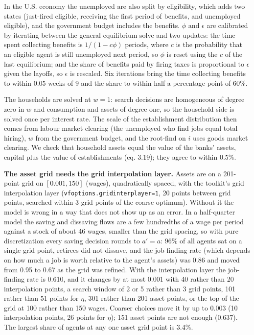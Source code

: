 \documentclass[11pt,fleqn]{article}
\begin{document}
In the U.S. economy the unemployed are also split by eligibility, which adds two states (just-fired eligible, receiving the first period of benefits, and unemployed eligible), and the government budget includes the benefits. $\phi$ and $\epsilon$ are calibrated by iterating between the general equilibrium solve and two updates: the time spent collecting benefits is $1/(1-c\phi)$ periods, where $c$ is the probability that an eligible agent is still unemployed next period, so $\phi$ is reset using the $c$ of the last equilibrium; and the share of benefits paid by firing taxes is proportional to $\epsilon$ given the layoffs, so $\epsilon$ is rescaled. Six iterations bring the time collecting benefits to within 0.05 weeks of 9 and the share to within half a percentage point of 60\%.

The households are solved at $w=1$: search decisions are homogeneous of degree zero in $w$ and consumption and assets of degree one, so the household side is solved once per interest rate. The scale of the establishment distribution then comes from labour market clearing (the unemployed who find jobs equal total hiring), $w$ from the government budget, and the root-find on $i$ uses goods market clearing. We check that household assets equal the value of the banks' assets, capital plus the value of establishments (eq. 3.19); they agree to within 0.5\%.

\textbf{The asset grid needs the grid interpolation layer.} Assets are on a 201-point grid on $[0.001,150]$ (wages), quadratically spaced, with the toolkit's grid interpolation layer (\verb|vfoptions.gridinterplayer=1|, 20 points between grid points, searched within 3 grid points of the coarse optimum). Without it the model is wrong in a way that does not show up as an error. In a half-quarter model the saving and dissaving flows are a few hundredths of a wage per period against a stock of about 46 wages, smaller than the grid spacing, so with pure discretization every saving decision rounds to $a'=a$: 96\% of all agents sat on a single grid point, retirees did not dissave, and the job-finding rate (which depends on how much a job is worth relative to the agent's assets) was 0.86 and moved from 0.95 to 0.67 as the grid was refined. With the interpolation layer the job-finding rate is 0.610, and it changes by at most 0.001 with 40 rather than 20 interpolation points, a search window of 2 or 5 rather than 3 grid points, 101 rather than 51 points for $\eta$, 301 rather than 201 asset points, or the top of the grid at 100 rather than 150 wages. Coarser choices move it by up to 0.003 (10 interpolation points, 26 points for $\eta$); 151 asset points are not enough (0.637). The largest share of agents at any one asset grid point is 3.4\%.
\end{document}
